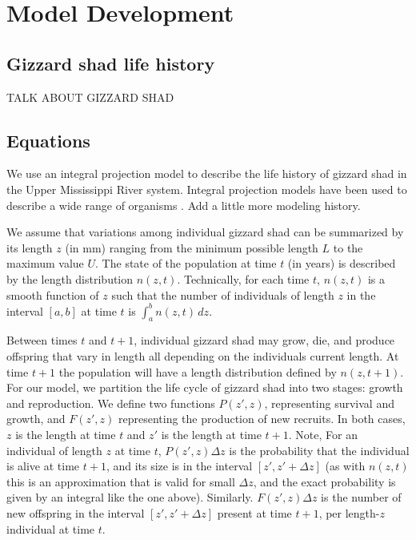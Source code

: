 \documentclass[11pt,oneside]{amsart}
\def\ds{\displaystyle}
\theoremstyle{definition}
\begin{document}
\section{Model Development}
\subsection{Gizzard shad life history}
TALK ABOUT GIZZARD SHAD

\subsection{Equations}
We use an integral projection model to describe the life history of gizzard shad in the Upper Mississippi River system.  Integral projection models have been used to describe a wide range of organisms \citep{ellner2016data, merow2014advancing, rees2014building}.  Add a little more modeling history.

We assume that variations among individual gizzard shad can be summarized by its length $z$ (in mm) ranging from the minimum possible length $L$ to the maximum value $U$.  The state of the population at time $t$ (in years) is described by the length distribution $n(z,t)$.  Technically, for each time $t$, $n(z,t)$ is a smooth function of $z$ such that the number of individuals of length $z$ in the interval $[a,b]$ at time $t$ is $\ds \int_a^b n(z,t) \, dz$. 

Between times $t$ and $t+1$, individual gizzard shad may grow, die, and produce offspring that vary in length all depending on the individuals current length. At time $t+1$ the population will have a length distribution defined by $n(z, t+1)$. For our model, we partition the life cycle of gizzard shad into two stages: growth and reproduction.  We define two functions $P(z',z)$, representing survival and growth, and $F(z',z)$ representing the production of new recruits.  In both cases, $z$ is the length at time $t$ and $z'$ is the length at time $t+1$.  Note, For an individual of length $z$ at time $t$, $P(z',z)\Delta z$ is the probability that the individual is alive at time $t+1$, and its size is in the interval $[z', z' + \Delta z]$ (as with $n(z,t)$ this is an approximation that is valid for small $\Delta z$, and the exact probability is given by an integral like the one above). Similarly. $F(z',z)\Delta z$ is the number of new offspring in the interval $[z', z' + \Delta z]$ present at time $t+1$, per length-$z$ individual at time $t$.
\end{document}
